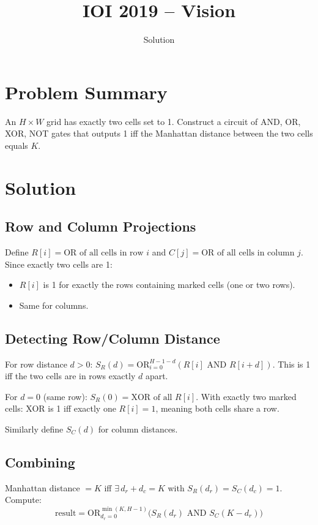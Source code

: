 \documentclass[11pt,a4paper]{article}
\title{IOI 2019 -- Vision}
\author{Solution}
\date{}
\begin{document}
\maketitle

\section{Problem Summary}
An $H \times W$ grid has exactly two cells set to 1. Construct a circuit of AND, OR, XOR, NOT gates that outputs 1 iff the Manhattan distance between the two cells equals $K$.

\section{Solution}

\subsection{Row and Column Projections}
Define $R[i] = \text{OR of all cells in row } i$ and $C[j] = \text{OR of all cells in column } j$. Since exactly two cells are 1:
\begin{itemize}
  \item $R[i]$ is 1 for exactly the rows containing marked cells (one or two rows).
  \item Same for columns.
\end{itemize}

\subsection{Detecting Row/Column Distance}
For row distance $d > 0$: $S_R(d) = \text{OR}_{i=0}^{H-1-d}(R[i] \text{ AND } R[i+d])$. This is 1 iff the two cells are in rows exactly $d$ apart.

For $d = 0$ (same row): $S_R(0) = \text{XOR of all } R[i]$. With exactly two marked cells: XOR is 1 iff exactly one $R[i] = 1$, meaning both cells share a row.

Similarly define $S_C(d)$ for column distances.

\subsection{Combining}
Manhattan distance $= K$ iff $\exists\, d_r + d_c = K$ with $S_R(d_r) = S_C(d_c) = 1$. Compute:
\[
  \text{result} = \text{OR}_{d_r=0}^{\min(K, H-1)} \bigl(S_R(d_r) \text{ AND } S_C(K - d_r)\bigr)
\]
\end{document}
